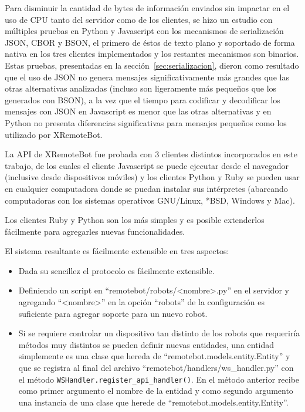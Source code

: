 Para disminuir la cantidad de bytes de información enviados sin impactar en el
uso de CPU tanto del servidor como de los clientes, se hizo un estudio con
múltiples pruebas en Python y Javascript con los mecanismos de serialización
JSON, CBOR y BSON, el primero de éstos de texto plano y soportado de forma
nativa en los tres clientes implementados y los restantes mecanismos son
binarios. Estas pruebas, presentadas en la sección~\ref{sec:serializacion},
dieron como resultado que el uso de JSON no genera mensajes significativamente
más grandes que las otras alternativas analizadas (incluso son ligeramente más
pequeños que los generados con BSON), a la vez que el tiempo para codificar y
decodificar los mensajes con JSON en Javascript es menor que las otras
alternativas y en Python no presenta
diferencias significativas para mensajes pequeños como los utilizado
por XRemoteBot.

La API de XRemoteBot fue probada con 3 clientes distintos incorporados en este
trabajo, de los cuales el cliente Javascript se puede ejecutar desde el
navegador (inclusive desde dispositivos móviles) y los clientes Python y
Ruby se pueden usar en cualquier computadora
donde se puedan instalar sus intérpretes (abarcando computadoras con
los sistemas operativos GNU/Linux, *BSD, Windows y Mac).

Los clientes Ruby y Python son los más simples y es posible extenderlos
fácilmente para agregarles nuevas funcionalidades.

El sistema resultante es fácilmente extensible en tres aspectos:
\begin{itemize}
    \item Dada su sencillez el protocolo es fácilmente extensible.
    \item Definiendo un script en ``remotebot/robots/<nombre>.py''
en el servidor y agregando ``<nombre>'' en la opción ``robots''
de la configuración es suficiente para agregar soporte
para un nuevo robot.
    \item Si se requiere controlar un dispositivo tan distinto de los
        robots que requeriría métodos muy distintos se pueden definir
        nuevas entidades, una entidad simplemente es una clase que
        hereda de ``remotebot.models.entity.Entity'' y que se
        registra al final del archivo ``remotebot/handlers/ws\_handler.py''
        con el método \texttt{WSHandler.register\_api\_handler()}.
        En el método anterior recibe como primer argumento el
        nombre de la entidad y como segundo argumento una instancia
        de una clase que herede de ``remotebot.models.entity.Entity''.
\end{itemize}

